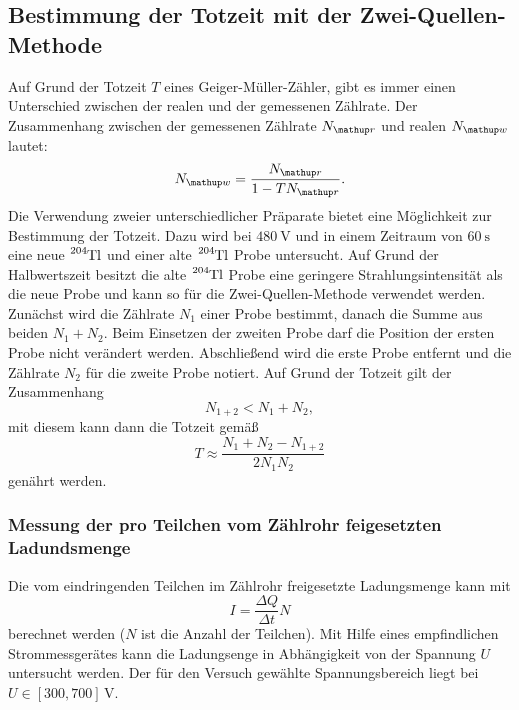 \subsection{Bestimmung der Totzeit mit der Zwei-Quellen-Methode}
Auf Grund der Totzeit $T$ eines Geiger-Müller-Zähler, gibt es immer einen
Unterschied zwischen der realen und der gemessenen Zählrate. %
Der Zusammenhang zwischen der gemessenen Zählrate $N\ua{r}$ und
realen $N\ua{w}$ lautet: %
\begin{equation}
  \label{eq:wahre_zaehlrate}
  N\ua{w}=\frac{N\ua{r}}{1-TN\ua{r}}.
\end{equation}
Die Verwendung zweier unterschiedlicher Präparate bietet eine Möglichkeit zur %
Bestimmung der Totzeit. Dazu wird bei $\SI{480}{\volt}$ und in einem Zeitraum von $\SI{60}{\second}$ eine neue %
$\ce{^{204}Tl}$ und einer alte $\ce{^{204}Tl}$ Probe untersucht.
Auf Grund der Halbwertszeit besitzt die alte $\ce{^{204}Tl}$ Probe eine geringere
Strahlungsintensität als die neue Probe und kann so für die Zwei-Quellen-Methode verwendet
werden.  %
Zunächst wird die Zählrate $N_1$ einer Probe bestimmt, danach die %
Summe aus beiden $N_1+N_2$. Beim Einsetzen der zweiten Probe darf die Position der
ersten Probe nicht verändert werden.
Abschließend wird die erste Probe entfernt und die Zählrate $N_2$ für die zweite
Probe notiert.
Auf Grund der Totzeit gilt der Zusammenhang
\begin{equation}
  \label{eq:totzeit_summe}
  N_{1+2}<N_1+N_2,
\end{equation}
mit diesem kann dann die Totzeit gemäß %
\begin{equation}
  \label{eq:totzeit}
  T\approx \frac{N_1+N_2-N_{1+2}}{2N_1N_2}
\end{equation}
genährt werden.

\subsubsection{Messung der pro Teilchen vom Zählrohr feigesetzten Ladundsmenge} %
Die vom eindringenden Teilchen im Zählrohr freigesetzte Ladungsmenge kann mit
\begin{equation}
  \label{eq:lafung_pro_teilchen}
  I=\frac{\Delta Q}{\Delta t} N
\end{equation}
berechnet werden ($N$ ist die Anzahl der Teilchen).
Mit Hilfe eines empfindlichen Strommessgerätes
kann die Ladungsenge in Abhängigkeit von der Spannung $U$ untersucht werden.
Der für den Versuch gewählte Spannungsbereich liegt bei $U\in\left[300, 700\right] \, \si{\volt}$.
